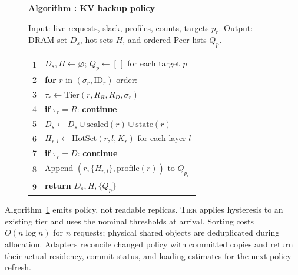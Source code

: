 \begin{figure}[t]
  \raggedright
  \label{alg:placement}
  \noindent\textbf{Algorithm \thedesignalgorithm: KV backup policy}
  \par\smallskip
  \noindent Input: live requests, slack, profiles, counts, targets $p_r$.
  Output: DRAM set $D_s$, hot sets $H$, and ordered Peer lists $Q_p$.
  \par\smallskip
  \begin{tabularx}{\columnwidth}{@{}r@{\quad}X@{}}
    \toprule
    1 & $D_s,H\gets\varnothing$; $Q_p\gets[\,]$ for each target $p$ \\
    2 & \textbf{for} $r$ in $(\sigma_r,\mathrm{ID}_r)$ order: \\
    3 & \quad$\tau_r\gets\mathrm{Tier}(r,R_R,R_D,\sigma_r)$ \\
    4 & \quad\textbf{if} $\tau_r=R$: \textbf{continue} \\
    5 & \quad$D_s\gets D_s\cup\mathrm{sealed}(r)\cup\mathrm{state}(r)$ \\
    6 & \quad$H_{r,l}\gets\mathrm{HotSet}(r,l,K_r)$ for each layer $l$ \\
    7 & \quad\textbf{if} $\tau_r=D$: \textbf{continue} \\
    8 & \quad Append $(r,\{H_{r,l}\},\mathrm{profile}(r))$ to $Q_{p_r}$ \\
    9 & \textbf{return} $D_s,H,\{Q_p\}$ \\
    \bottomrule
  \end{tabularx}
\end{figure}

Algorithm~\ref{alg:placement} emits policy, not readable replicas.
\textsc{Tier} applies hysteresis to an existing tier and uses the nominal
thresholds at arrival. Sorting costs $O(n\log n)$ for $n$ requests;
physical shared objects are deduplicated during allocation. Adapters
reconcile changed policy with committed copies and return their actual
residency, commit status, and loading estimates for the next policy refresh.

